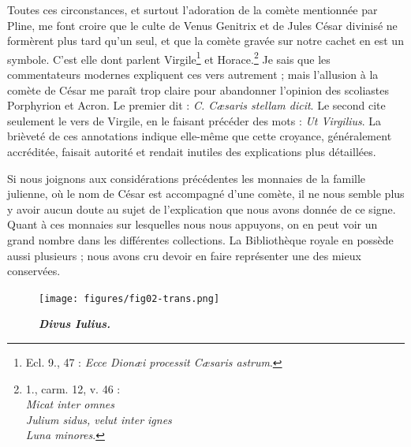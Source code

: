 \documentclass[a4paper, 11pt, oneside, polutonikogreek, french]{article}
\begin{document}
Toutes ces circonstances, et surtout l'adoration de la comète mentionnée par Pline, me font croire que le culte de Venus Genitrix et de Jules César divinisé ne formèrent plus tard qu'un seul, et que la comète gravée sur notre cachet en est un symbole. C'est elle dont parlent Virgile\footnote{Ecl. 9., 47 : \emph{Ecce Dionæi processit Cæsaris astrum}.} et Horace.\footnote{1., carm. 12, v. 46 :\\\hspace*{10mm}\emph{Micat inter omnes}\\\hspace*{10mm}\emph{Julium sidus, velut inter ignes}\\\hspace*{10mm}\emph{Luna minores}.} Je sais que les commentateurs modernes expliquent ces vers autrement ; mais l'allusion à la comète de César me paraît trop claire pour abandonner l'opinion des scoliastes Porphyrion et Acron. Le premier dit : \emph{C. Cæsaris stellam dicit}. Le second cite seulement le vers de Virgile, en le faisant précéder des mots : \emph{Ut Virgilius}. La brièveté de ces annotations indique elle-même que cette croyance, généralement accréditée, faisait autorité et rendait inutiles des explications plus détaillées.

Si nous joignons aux considérations précédentes les monnaies de la famille julienne, où le nom de César est accompagné d'une comète, il ne nous semble plus y avoir aucun doute au sujet de l'explication que nous avons donnée de ce signe. Quant à ces monnaies sur lesquelles nous nous appuyons, on en peut voir un grand nombre dans les différentes collections. La Bibliothèque royale en possède aussi plusieurs ; nous avons cru devoir en faire représenter une des mieux conservées.

\begin{figure}[H]
\centering
\texttt{[image: figures/fig02-trans.png]}
\caption{\bfseries \emph{Divus Iulius.}}
\end{figure}
\end{document}
